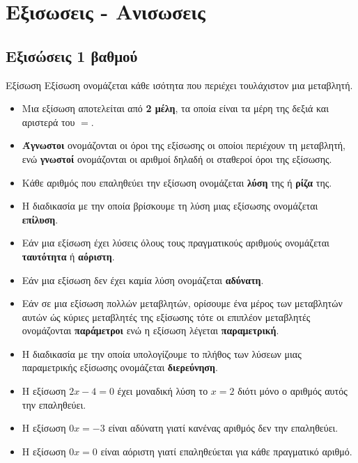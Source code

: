 \chapter{Εξισωσεις - Ανισωσεις}
\section{Εξισώσεις 1 βαθμού}
\thewria
\begin{orismos}{Εξίσωση}
Εξίσωση ονομάζεται κάθε ισότητα που περιέχει τουλάχιστον μια μεταβλητή.
\end{orismos}
\begin{itemize}[itemsep=0mm]
\item Μια εξίσωση αποτελείται από \textbf{2 μέλη}, τα οποία είναι τα μέρη της δεξιά και αριστερά του $ = $.
\item \textbf{Άγνωστοι} ονομάζονται οι όροι της εξίσωσης οι οποίοι περιέχουν τη μεταβλητή, ενώ \textbf{γνωστοί} ονομάζονται οι αριθμοί δηλαδή οι σταθεροί όροι της εξίσωσης.
\item Κάθε αριθμός που επαληθεύει την εξίσωση ονομάζεται \textbf{λύση} της ή \textbf{ρίζα} της.
\item Η διαδικασία με την οποία βρίσκουμε τη λύση μιας εξίσωσης ονομάζεται \textbf{επίλυση}.
\item Εάν μια εξίσωση έχει λύσεις όλους τους πραγματικούς αριθμούς ονομάζεται \textbf{ταυτότητα} ή \textbf{αόριστη}.
\item Εάν μια εξίσωση δεν έχει καμία λύση ονομάζεται \textbf{αδύνατη}.
\item Εάν σε μια εξίσωση πολλών μεταβλητών, ορίσουμε ένα μέρος των μεταβλητών αυτών ώς κύριες μεταβλητές της εξίσωσης τότε οι επιπλέον μεταβλητές ονομάζονται \textbf{παράμετροι} ενώ η εξίσωση λέγεται \textbf{παραμετρική}.
\item Η διαδικασία με την οποία υπολογίζουμε το πλήθος των λύσεων μιας παραμετρικής εξίσωσης ονομάζεται \textbf{διερεύνηση}.
\end{itemize}
\vspace{-7mm}
\begin{itemize}
\item Η εξίσωση $ 2x-4=0 $ έχει μοναδική λύση το $ x=2 $ διότι μόνο ο αριθμός αυτός την επαληθεύει.
\item Η εξίσωση $ 0x=-3 $ είναι αδύνατη γιατί κανένας αριθμός δεν την επαληθεύει.
\item Η εξίσωση $ 0x=0 $ είναι αόριστη γιατί επαληθεύεται για κάθε πραγματικό αριθμό.
\end{itemize}
